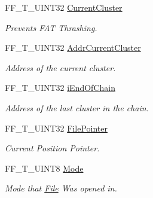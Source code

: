 \begin{DoxyCompactItemize}
\mbox{\label{struct___f_f___f_i_l_e_acc235e284e0a5a5bb9f676df83e16d86}} 
F\+F\+\_\+\+T\+\_\+\+U\+I\+N\+T32 \hyperlink{struct___f_f___f_i_l_e_acc235e284e0a5a5bb9f676df83e16d86}{Current\+Cluster}
\begin{DoxyCompactList}\small\item\em Prevents F\+AT Thrashing. \end{DoxyCompactList}\item 
\mbox{\label{struct___f_f___f_i_l_e_aef21ec03f07613880a69c3fc2c78b97e}} 
F\+F\+\_\+\+T\+\_\+\+U\+I\+N\+T32 \hyperlink{struct___f_f___f_i_l_e_aef21ec03f07613880a69c3fc2c78b97e}{Addr\+Current\+Cluster}
\begin{DoxyCompactList}\small\item\em Address of the current cluster. \end{DoxyCompactList}\item 
\mbox{\label{struct___f_f___f_i_l_e_af944b24b154a11e39ee90dd4266554f2}} 
F\+F\+\_\+\+T\+\_\+\+U\+I\+N\+T32 \hyperlink{struct___f_f___f_i_l_e_af944b24b154a11e39ee90dd4266554f2}{i\+End\+Of\+Chain}
\begin{DoxyCompactList}\small\item\em Address of the last cluster in the chain. \end{DoxyCompactList}\item 
\mbox{\label{struct___f_f___f_i_l_e_a9e257632b3ab3afb89555043af3dd1b9}} 
F\+F\+\_\+\+T\+\_\+\+U\+I\+N\+T32 \hyperlink{struct___f_f___f_i_l_e_a9e257632b3ab3afb89555043af3dd1b9}{File\+Pointer}
\begin{DoxyCompactList}\small\item\em Current Position Pointer. \end{DoxyCompactList}\item 
\mbox{\label{struct___f_f___f_i_l_e_a5d6d3d727e6094da2163626c8d187663}} 
F\+F\+\_\+\+T\+\_\+\+U\+I\+N\+T8 \hyperlink{struct___f_f___f_i_l_e_a5d6d3d727e6094da2163626c8d187663}{Mode}
\begin{DoxyCompactList}\small\item\em Mode that \hyperlink{class_file}{File} Was opened in. \end{DoxyCompactList}\item 

\end{DoxyCompactItemize}

